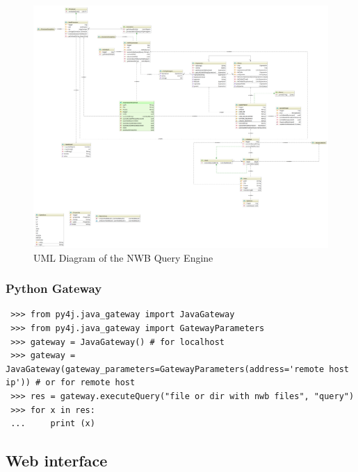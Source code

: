 \documentclass[utf8]{frontiersSCNS} %
\begin{document}
\begin{figure}
  \includegraphics[width=17cm]{diagram}
\caption{UML Diagram of the NWB Query Engine}
\label{fig:diagram}
\end{figure}

\subsubsection{Python Gateway}
\label{Python_Gateway}

\begin{lstlisting}
 >>> from py4j.java_gateway import JavaGateway
 >>> from py4j.java_gateway import GatewayParameters
 >>> gateway = JavaGateway() # for localhost
 >>> gateway = JavaGateway(gateway_parameters=GatewayParameters(address='remote host ip')) # or for remote host
 >>> res = gateway.executeQuery("file or dir with nwb files", "query")
 >>> for x in res:
 ...     print (x)
\end{lstlisting}

\subsection{Web interface}
\label{web_interface}
\end{document}
